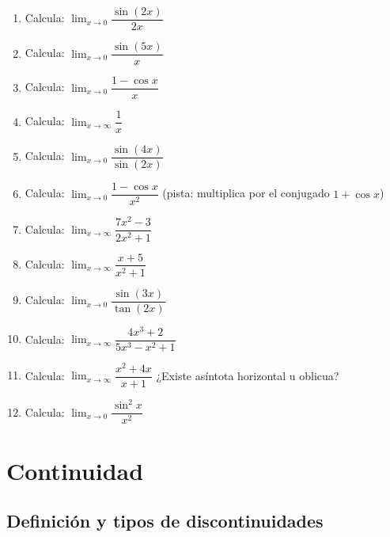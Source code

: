 \documentclass[12pt, letterpaper]{article}
\begin{document}
\begin{enumerate}[series=ejercicios, leftmargin=*]
  \item \facil{} Calcula: $\lim_{x \to 0} \dfrac{\sin(2x)}{2x}$

  \item \facil{} Calcula: $\lim_{x \to 0} \dfrac{\sin(5x)}{x}$

  \item \facil{} Calcula: $\lim_{x \to 0} \dfrac{1 - \cos x}{x}$

  \item \facil{} Calcula: $\lim_{x \to \infty} \dfrac{1}{x}$

  \item \medio{} Calcula: $\lim_{x \to 0} \dfrac{\sin(4x)}{\sin(2x)}$

  \item \medio{} Calcula: $\lim_{x \to 0} \dfrac{1 - \cos x}{x^2}$ (pista: multiplica por el conjugado $1 + \cos x$)

  \item \medio{} Calcula: $\lim_{x \to \infty} \dfrac{7x^2 - 3}{2x^2 + 1}$

  \item \medio{} Calcula: $\lim_{x \to \infty} \dfrac{x + 5}{x^2 + 1}$

  \item \dificil{} Calcula: $\lim_{x \to 0} \dfrac{\sin(3x)}{\tan(2x)}$

  \item \dificil{} Calcula: $\lim_{x \to \infty} \dfrac{4x^3 + 2}{5x^3 - x^2 + 1}$

  \item \dificil{} Calcula: $\lim_{x \to \infty} \dfrac{x^2 + 4x}{x + 1}$ ¿Existe asíntota horizontal u oblicua?

  \item \dificil{} Calcula: $\lim_{x \to 0} \dfrac{\sin^2 x}{x^2}$
\end{enumerate}

\newpage


\section{Continuidad}

\subsection{Definición y tipos de discontinuidades}
\end{document}
